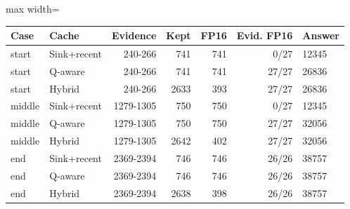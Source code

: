 \scriptsize
\setlength{\tabcolsep}{3.5pt}
\label{tab:t2cmasks2048}
\begin{adjustbox}{max width=\linewidth}
\begin{tabular}{llrrrrl}
\toprule
Case & Cache & Evidence & Kept & FP16 & Evid. FP16 & Answer \\
\midrule
start & Sink+recent & 240-266 & 741 & 741 & 0/27 & 12345 \\
start & Q-aware & 240-266 & 741 & 741 & 27/27 & 26836 \\
start & Hybrid & 240-266 & 2633 & 393 & 27/27 & 26836 \\
middle & Sink+recent & 1279-1305 & 750 & 750 & 0/27 & 12345 \\
middle & Q-aware & 1279-1305 & 750 & 750 & 27/27 & 32056 \\
middle & Hybrid & 1279-1305 & 2642 & 402 & 27/27 & 32056 \\
end & Sink+recent & 2369-2394 & 746 & 746 & 26/26 & 38757 \\
end & Q-aware & 2369-2394 & 746 & 746 & 26/26 & 38757 \\
end & Hybrid & 2369-2394 & 2638 & 398 & 26/26 & 38757 \\
\bottomrule
\end{tabular}
\end{adjustbox}
